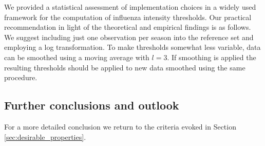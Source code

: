 \documentclass{article}
\begin{document}
We provided a statistical assessment of implementation choices in a widely used framework for the computation of influenza intensity thresholds. Our practical recommendation in light of the theoretical and empirical findings is as follows. We suggest including just one observation per season into the reference set and employing a log transformation. To make thresholds somewhat less variable, data can be smoothed using a moving average with $l = 3$. If smoothing is applied the resulting thresholds should be applied to new data smoothed using the same procedure. %

\subsection{Further conclusions and outlook}

For a more detailed conclusion we return to the criteria evoked in Section \ref{sec:desirable_properties}.
\end{document}
